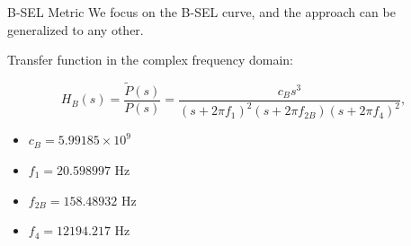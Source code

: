 \documentclass{beamer}
\newcounter{sectionframecount}
\begin{document}

\begin{frame}[t]{B-SEL Metric}
\vspace{-10pt}
We focus on the B-SEL curve, and the approach can be generalized to any other.

\vspace{10pt}
Transfer function in the complex frequency domain:

\begin{equation}
  H_B(s) =\dfrac{\tilde{P}(s)}{P(s)} = \dfrac{c_B s^3}{(s+2\pi f_1)^2(s+2\pi f_{2B})(s+2\pi f_4)^2},
  \label{e:continuous_transfer}
\end{equation}

\vspace{10pt}
\begin{itemize}
  \item $c_B = 5.99185 \times 10^9$
  \item $f_1 = 20.598997$ Hz
  \item $f_{2B} = 158.48932$ Hz
  \item $f_4 = 12194.217$ Hz
\end{itemize}


\end{frame}

\end{document}
